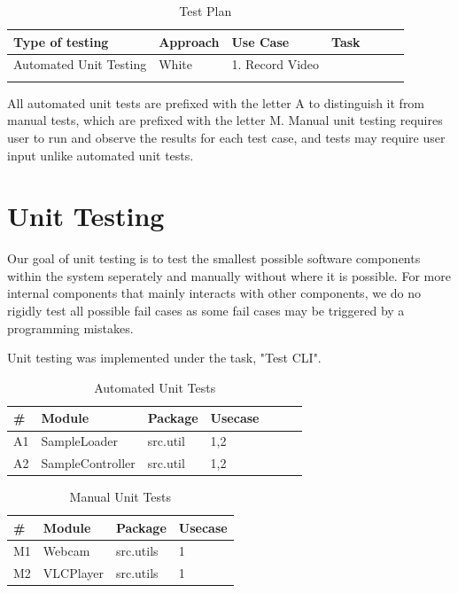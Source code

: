 \documentclass[12pt,a4paper,man]{report}
\begin{document}
\begin{table}[htbp]
\caption{\label{table:testt}
Test Plan}
\centering
\begin{tabular}{|l|l|l|l|l|lp{3cm}|}
\hline
\textbf{Type of testing} & \textbf{Approach} & \textbf{Use Case} & \textbf{Task}\\
\hline
Automated Unit Testing & White & 1. Record Video & \\
 &  &  & \\
\end{tabular}
\end{table}


All automated unit tests are prefixed with the letter A to distinguish it from manual tests, which are prefixed with the letter M. Manual unit testing requires user to run and observe the results for each test case, and tests may require user input unlike automated unit tests.

\section{Unit Testing}
\label{sec:org76d5dcb}
Our goal of unit testing is to test the smallest possible software components within the system seperately and manually without where it is possible. For more internal components that mainly interacts with other components, we do no rigidly test all possible fail cases as some fail cases may be triggered by a programming mistakes. 

Unit testing was implemented under the task, "Test CLI". 

\begin{table}[htbp]
\caption{\label{table:autests}
Automated Unit Tests}
\centering
\begin{tabular}{|l|l|l|l|l|lp{3cm}|}
\hline
\textbf{\#} & \textbf{Module} & \textbf{Package} & \textbf{Usecase}\\
\hline
A1 & SampleLoader & src.util & 1,2\\
A2 & SampleController & src.util & 1,2\\
\hline
\end{tabular}
\end{table}

\begin{table}[htbp]
\caption{\label{table:mutests}
Manual Unit Tests}
\centering
\begin{tabular}{|l|l|lp{3cm}|}
\hline
\textbf{\#} & \textbf{Module} & \textbf{Package} & \textbf{Usecase}\\
\hline
M1 & Webcam & src.utils & 1\\
M2 & VLCPlayer & src.utils & 1\\
\hline
\end{tabular}
\end{table}
\end{document}
